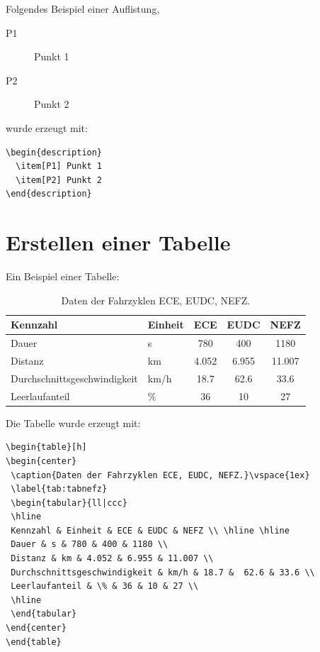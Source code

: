 Folgendes Beispiel einer Auflistung,
\begin{description}
  \item[P1] Punkt 1
  \item[P2] Punkt 2
\end{description}
wurde erzeugt mit:
\begin{verbatim}
\begin{description}
  \item[P1] Punkt 1
  \item[P2] Punkt 2
\end{description}
\end{verbatim}


\section{Erstellen einer Tabelle}\label{sec:tabellen}

Ein Beispiel einer Tabelle:
\begin{table}[h]
\begin{center}
 \caption{Daten der Fahrzyklen ECE, EUDC, NEFZ.}\vspace{1ex}
 \label{tab:tabnefz}
 \begin{tabular}{ll|ccc}
 \hline
 Kennzahl & Einheit & ECE & EUDC & NEFZ \\ \hline \hline
 Dauer & s & 780 & 400 & 1180 \\
 Distanz & km & 4.052 & 6.955 & 11.007 \\
 Durchschnittsgeschwindigkeit & km/h & 18.7 &  62.6 & 33.6 \\
 Leerlaufanteil & \% & 36 & 10 & 27 \\
 \hline
 \end{tabular}
\end{center}
\end{table}

Die Tabelle wurde erzeugt mit:
\begin{verbatim}
\begin{table}[h]
\begin{center}
 \caption{Daten der Fahrzyklen ECE, EUDC, NEFZ.}\vspace{1ex}
 \label{tab:tabnefz}
 \begin{tabular}{ll|ccc}
 \hline
 Kennzahl & Einheit & ECE & EUDC & NEFZ \\ \hline \hline
 Dauer & s & 780 & 400 & 1180 \\
 Distanz & km & 4.052 & 6.955 & 11.007 \\
 Durchschnittsgeschwindigkeit & km/h & 18.7 &  62.6 & 33.6 \\
 Leerlaufanteil & \% & 36 & 10 & 27 \\
 \hline
 \end{tabular}
\end{center}
\end{table}
\end{verbatim}


